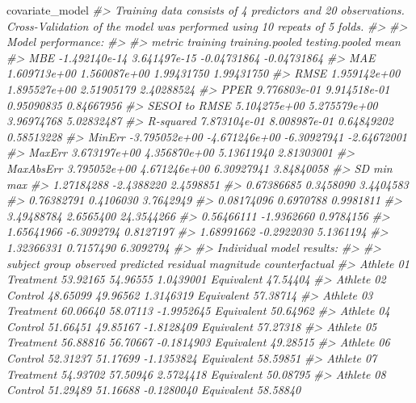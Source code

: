 \documentclass[
]{book}
\newenvironment{Shaded}{\begin{snugshade}}{\end{snugshade}}
\newcommand{\CommentTok}[1]{\textcolor[rgb]{0.56,0.35,0.01}{\textit{#1}}}
\newcommand{\NormalTok}[1]{#1}
\begin{document}
\begin{Shaded}
\begin{Highlighting}[]
\NormalTok{covariate\_model}
\CommentTok{\#> Training data consists of 4 predictors and 20 observations. Cross{-}Validation of the model was performed using 10 repeats of 5 folds.}
\CommentTok{\#> }
\CommentTok{\#> Model performance:}
\CommentTok{\#> }
\CommentTok{\#>         metric      training training.pooled testing.pooled        mean}
\CommentTok{\#>            MBE {-}1.492140e{-}14    3.641497e{-}15    {-}0.04731864 {-}0.04731864}
\CommentTok{\#>            MAE  1.609713e+00    1.560087e+00     1.99431750  1.99431750}
\CommentTok{\#>           RMSE  1.959142e+00    1.895527e+00     2.51905179  2.40288524}
\CommentTok{\#>           PPER  9.776803e{-}01    9.914518e{-}01     0.95090835  0.84667956}
\CommentTok{\#>  SESOI to RMSE  5.104275e+00    5.275579e+00     3.96974768  5.02832487}
\CommentTok{\#>      R{-}squared  7.873104e{-}01    8.008987e{-}01     0.64849202  0.58513228}
\CommentTok{\#>         MinErr {-}3.795052e+00   {-}4.671246e+00    {-}6.30927941 {-}2.64672001}
\CommentTok{\#>         MaxErr  3.673197e+00    4.356870e+00     5.13611940  2.81303001}
\CommentTok{\#>      MaxAbsErr  3.795052e+00    4.671246e+00     6.30927941  3.84840058}
\CommentTok{\#>          SD        min        max}
\CommentTok{\#>  1.27184288 {-}2.4388220  2.4598851}
\CommentTok{\#>  0.67386685  0.3458090  3.4404583}
\CommentTok{\#>  0.76382791  0.4106030  3.7642949}
\CommentTok{\#>  0.08174096  0.6970788  0.9981811}
\CommentTok{\#>  3.49488784  2.6565400 24.3544266}
\CommentTok{\#>  0.56466111 {-}1.9362660  0.9784156}
\CommentTok{\#>  1.65641966 {-}6.3092794  0.8127197}
\CommentTok{\#>  1.68991662 {-}0.2922030  5.1361194}
\CommentTok{\#>  1.32366331  0.7157490  6.3092794}
\CommentTok{\#> }
\CommentTok{\#> Individual model results:}
\CommentTok{\#> }
\CommentTok{\#>     subject     group observed predicted   residual  magnitude counterfactual}
\CommentTok{\#>  Athlete 01 Treatment 53.92165  54.96555  1.0439001 Equivalent       47.54404}
\CommentTok{\#>  Athlete 02   Control 48.65099  49.96562  1.3146319 Equivalent       57.38714}
\CommentTok{\#>  Athlete 03 Treatment 60.06640  58.07113 {-}1.9952645 Equivalent       50.64962}
\CommentTok{\#>  Athlete 04   Control 51.66451  49.85167 {-}1.8128409 Equivalent       57.27318}
\CommentTok{\#>  Athlete 05 Treatment 56.88816  56.70667 {-}0.1814903 Equivalent       49.28515}
\CommentTok{\#>  Athlete 06   Control 52.31237  51.17699 {-}1.1353824 Equivalent       58.59851}
\CommentTok{\#>  Athlete 07 Treatment 54.93702  57.50946  2.5724418 Equivalent       50.08795}
\CommentTok{\#>  Athlete 08   Control 51.29489  51.16688 {-}0.1280040 Equivalent       58.58840}

\end{Highlighting}
\end{Shaded}
\end{document}
